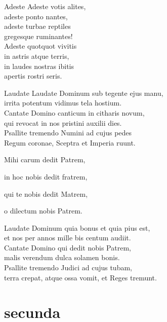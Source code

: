 \documentclass[tocstyle=ref-genre]{ees}
\begin{document}
{\begin{movement}{Adeste}
  Adeste votis alites,\\
  adeste ponto nantes,\\
  adeste turbae reptiles\\
  gregesque ruminantes!\\
  Adeste quotquot vivitis\\
  in astris atque terris,\\
  in laudes nostras ibitis\\
  apertis rostri seris.
\end{movement}

\begin{movement}{Laudate}
  \voice[Coro]
  Laudate Dominum sub tegente ejus manu,\\
  irrita potentum vidimus tela hostium.\\
  Cantate Domino canticum in citharis novum,\\
  qui revocat in nos pristini auxilii dies.\\
  Psallite tremendo Numini ad cujus pedes\\
  Regum coronae, Sceptra et Imperia ruunt.

  Mihi carum dedit Patrem,

  in hoc nobis dedit fratrem,

  qui te nobis dedit Matrem,

  \voice[Soli]
  o dilectum nobis Patrem.

  \voice[Coro]
  Laudate Dominum quia bonus et quia pius est,\\
  et nos per annos mille bis centum audiit.\\
  Cantate Domino qui dedit nobis Patrem,\\
  malis verendum dulca solamen bonis.\\
  Psallite tremendo Judici ad cujus tubam,\\
  terra crepat, atque ossa vomit, et Reges tremunt.
\end{movement}

\part{secunda}

}
\end{document}
